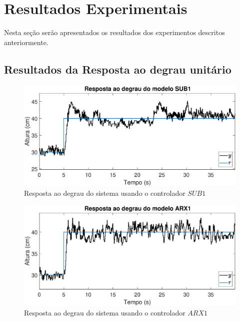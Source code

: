 \section{Resultados Experimentais}
Nesta seção serão apresentados os resultados dos experimentos descritos anteriormente.
\subsection{Resultados da Resposta ao degrau unitário}\label{rstep}

\begin{figure}[H]
	\centering
	\includegraphics[width=1\linewidth]{steprealsub1}
	\caption[Resposta ao degrau do sistema controlado $SUB1$]{Resposta ao degrau do sistema usando o controlador $SUB1$}
	\label{fig:steprealsub1}
\end{figure}

\begin{figure}[H]
	\centering
	\includegraphics[width=1\linewidth]{steprealarx1}
	\caption[Resposta ao degrau do sistema controlado $ARX1$]{Resposta ao degrau do sistema usando o controlador $ARX1$}
	\label{fig:steprealarx1}
\end{figure}

